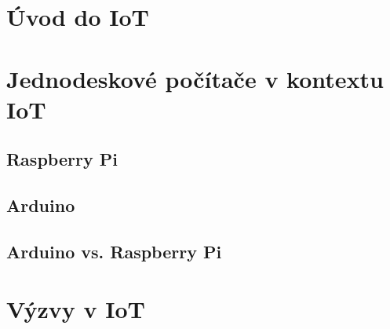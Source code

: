 
\section{Úvod do IoT}

\section{Jednodeskové počítače v kontextu IoT}

\subsection{Raspberry Pi}

\subsection{Arduino}
\subsection{Arduino vs. Raspberry Pi}






\section{Výzvy v IoT}
